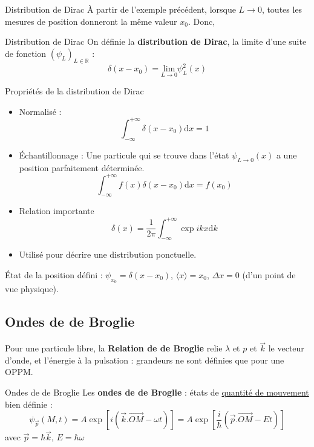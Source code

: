 \begin{Example}{Distribution de Dirac}{}
À partir de l'exemple précédent, lorsque $L \to 0$, toutes les mesures de position donneront la même valeur $x_0$. Donc, 

\begin{Definition}[colbacktitle=red!75!black]{Distribution de Dirac}{}
On définie la \textbf{distribution de Dirac}, la limite d'une suite de fonction $(\psi_L) _{L \in \mathbb{R}}$ : \[
  \boxed{\delta(x-x_0) =  \underset{L \to 0}{\mathrm{lim}} \psi_L ^2(x)}
\]
\end{Definition}

\begin{Prop}{Propriétés de la distribution de Dirac}{}
\begin{itemize}
    \item Normalisé : 
      \[
        \int_{- \infty}^{ + \infty} \delta(x-x_0) \mathrm{d} x = 1
      \]
    \item Échantillonnage : Une particule qui se trouve dans l'état $\psi _{L \to 0} (x)$ a une position parfaitement déterminée.
      \[
        \boxed{\int _{- \infty}^{+ \infty}f(x) \delta(x-x_0) \mathrm{d}x = f(x_0)}
      \] 
    \item {\color{red} Relation importante}
      \[
        \boxed{        \delta(x) = \frac{1}{2 \pi} \int _{- \infty}^{+ \infty}\exp{ikx} \mathrm{d}k}
      \] 
    \item Utilisé pour décrire une distribution ponctuelle.

\end{itemize}
\end{Prop}

État de la position défini : $\psi _{x_0} = \delta(x-x_0)$, $\langle x \rangle=x_0$, $\Delta x = 0$ (d'un point de vue physique).
\end{Example}

\subsection{Ondes de de Broglie} %
\label{sub:Ondes de de Broglie}

Pour une particule libre, la \textbf{Relation de de Broglie} relie $\lambda$ et $p$ et $\overrightarrow{k}$ le vecteur d'onde, et l'énergie à la pulsation : grandeurs ne sont définies que pour une OPPM.
\begin{Definition}[colbacktitle=red!75!black]{Ondes de de Broglie}{}
Les \textbf{ondes de de Broglie} : états de \underline{quantité de mouvement} bien définie :
\[
  \psi _{\overrightarrow{p}} ( M,t) = A \exp [i( \overrightarrow{k}. \overrightarrow{OM} - \omega t)] = \boxed{A \exp \left[ \frac{i}{\hbar}( \overrightarrow{p}. \overrightarrow{OM} - Et)\right]}
\]
avec $\overrightarrow{p} = \hbar \overrightarrow{k}$, $E = \hbar \omega$

\end{Definition}

